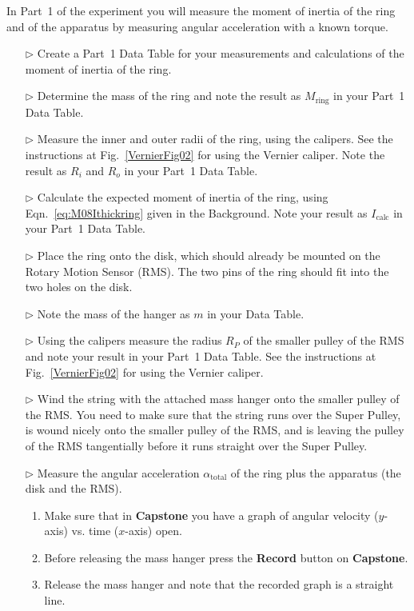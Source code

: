 In Part~1 of the experiment you will measure the moment of inertia of the ring and of the apparatus by measuring angular acceleration with a known torque.
\begin{itemize}
\item[$\triangleright$] Create a Part~1 Data Table for your measurements and calculations of the moment of inertia of the ring.
\item[$\triangleright$] Determine the mass of the ring and note the result as $M_{\mbox{ring}}$ in your Part~1 Data Table.
\item[$\triangleright$] Measure the inner and outer radii of the ring, using the calipers. See the instructions at Fig.~\ref{VernierFig02} for using the Vernier caliper. Note the result as $R_{i}$ and $R_{o}$ in your Part~1 Data Table.
\item[$\triangleright$] Calculate the expected moment of inertia of the ring, using Eqn.~\ref{eq:M08Ithickring} given in the Background. Note your result as $I_{\mbox{calc}}$ in your Part~1 Data Table.
\item[$\triangleright$] Place the ring onto the disk, which should already be mounted on the Rotary Motion Sensor (RMS). The two pins of the ring should fit into the two holes on the disk.
\item[$\triangleright$] Note the mass of the hanger as $m$ in your Data Table.
\item[$\triangleright$] Using the calipers measure the radius $R_{P}$ of the smaller pulley of the RMS and note your result in your Part~1 Data Table. See the instructions at Fig.~\ref{VernierFig02} for using the Vernier caliper.
\item[$\triangleright$] Wind the string with the attached mass hanger onto the smaller pulley of the RMS. You need to make sure that the string runs over the Super Pulley, is wound nicely onto the smaller pulley of the RMS, and is leaving the pulley of the RMS tangentially before it runs straight over the Super Pulley.
\item[$\triangleright$] Measure the angular acceleration $\alpha_{\mbox{total}}$ of the ring plus the apparatus (the disk and the RMS).
  \begin{enumerate}
  \item Make sure that in \textbf{Capstone} you have a graph of angular velocity ($y$-axis) vs. time ($x$-axis) open.
  \item Before releasing the mass hanger press the \textbf{Record} button on \textbf{Capstone}.
  \item Release the mass hanger and note that the recorded graph is a straight line.

\end{enumerate}
\end{itemize}
